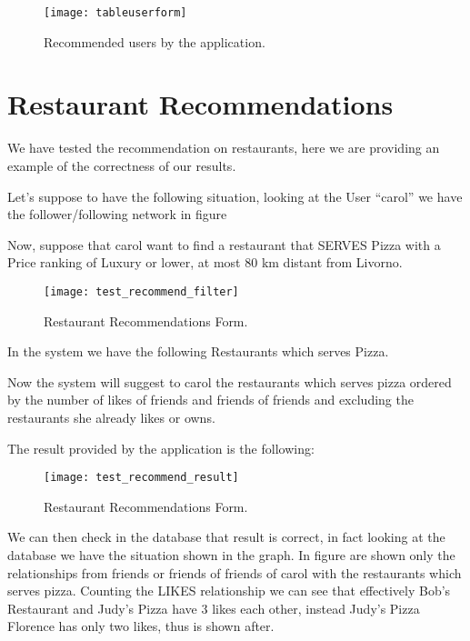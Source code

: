 \begin{figure}[htb]
	\centering
	\texttt{[image: tableuserform]}
	\caption{Recommended users by the application.}\label{fig:tableuserform}
\end{figure}

\section{Restaurant Recommendations}

We have tested the recommendation on restaurants, here we are providing an
example of the correctness of our results.

Let's suppose to have the following situation, looking at the User ``carol'' we
have the follower/following network in figure


Now, suppose that carol want to find a restaurant that SERVES Pizza with a Price
ranking of Luxury or lower, at most 80 km distant from Livorno.

\begin{figure}[H]
	\centering
	\texttt{[image: test\_recommend\_filter]}
	\caption{Restaurant Recommendations Form.}\label{fig:resrecform}
\end{figure}

In the system we have the following Restaurants which serves Pizza.


Now the system will suggest to carol the restaurants which serves pizza ordered
by the number of likes of friends and friends of friends and excluding the
restaurants she already likes or owns.

The result provided by the application is the following:

\begin{figure}[H]
	\centering
	\texttt{[image: test\_recommend\_result]}
	\caption{Restaurant Recommendations Form.}\label{fig:resrecform}
\end{figure}

We can then check in the database that result is correct, in fact looking at the
database we have the situation shown in the graph. In figure are shown only the
relationships from friends or friends of friends of carol with the restaurants
which serves pizza.  Counting the LIKES relationship we can see that effectively
Bob's Restaurant and Judy's Pizza have 3 likes each other, instead Judy's Pizza
Florence has only two likes, thus is shown after.

